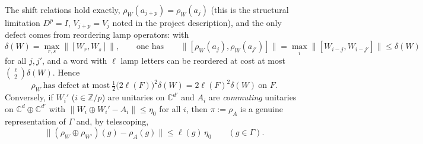 \documentclass[11pt]{amsart}
\theoremstyle{definition}
\theoremstyle{remark}
\newcommand{\Z}{\mathbb Z}
\newcommand{\C}{\mathbb C}
\newcommand{\norm}[1]{\lVert #1\rVert}
\newcommand{\lamp}{a}
\begin{document}
The shift relations hold exactly, $\rho_W(\lamp_{j+p})=\rho_W(\lamp_j)$ (this is the structural limitation $D^p=I$, $V_{j+p}=V_j$ noted in the project description), and the only defect comes from reordering lamp operators: with
\[
\delta(W)=\max_{r,s}\norm{[W_r,W_s]},\qquad\text{one has}\qquad \norm{[\rho_W(\lamp_j),\rho_W(\lamp_{j'})]}=\max_i\norm{[W_{i-j},W_{i-j'}]}\le\delta(W)
\]
for all $j,j'$,
and a word with $\ell$ lamp letters can be reordered at cost at most $\binom{\ell}{2}\delta(W)$. Hence
\begin{equation}\label{eq:defectF}
\rho_W\ \text{has defect at most}\ \tfrac12\bigl(2\ell(F)\bigr)^2\delta(W)=2\ell(F)^2\delta(W)\ \text{on } F.
\end{equation}
Conversely, if $W_i'$ ($i\in\Z/p$) are unitaries on $\C^{d'}$ and $A_i$ are \emph{commuting} unitaries on $\C^{d}\oplus\C^{d'}$ with $\norm{W_i\oplus W_i'-A_i}\le\eta_0$ for all $i$, then $\pi:=\rho_A$ is a genuine representation of $\Gamma$ and, by telescoping,
\begin{equation}\label{eq:closeF}
\norm{(\rho_W\oplus\rho_{W'})(g)-\rho_A(g)}\le\ell(g)\,\eta_0\qquad(g\in\Gamma).
\end{equation}
\end{document}
